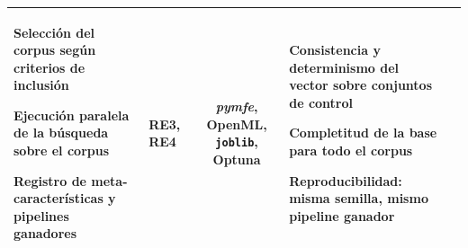 \documentclass[12pt,letterpaper,oneside]{article}
\begin{document}
\begin{table}[H]
\begin{tabularx}{\textwidth}{>{}L>{}L>{}C>{}L>{}L}
\begin{celdaitem}
  \item Selección del corpus según criterios de inclusión
  \item Ejecución paralela de la búsqueda sobre el corpus
  \item Registro de meta-características y pipelines ganadores
\end{celdaitem} &
RE3, RE4 &
\textit{pymfe}, OpenML, \texttt{joblib}, Optuna &
\begin{celdaitem}
  \item Consistencia y determinismo del vector sobre conjuntos de control
  \item Completitud de la base para todo el corpus
  \item Reproducibilidad: misma semilla, mismo pipeline ganador
\end{celdaitem} \\
\bottomrule
\end{tabularx}
\end{table}
\end{document}
